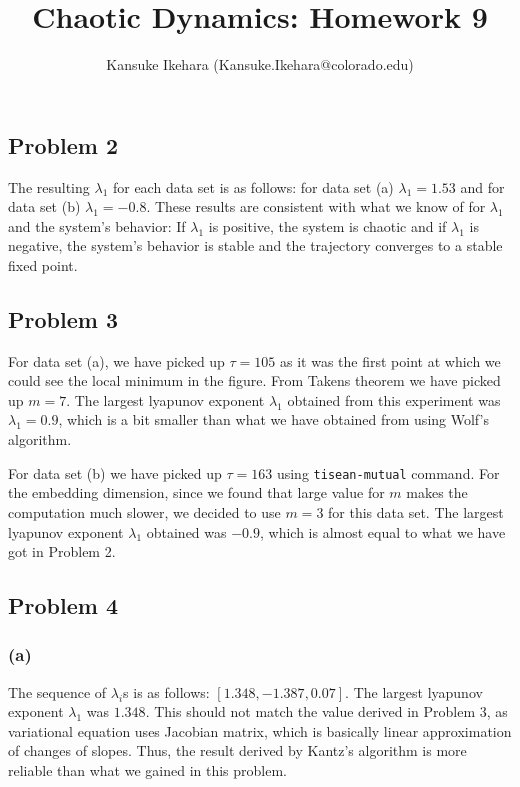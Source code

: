 \documentclass{article}
\title{Chaotic Dynamics: Homework 9}
\author{Kansuke Ikehara (Kansuke.Ikehara@colorado.edu)}
\begin{document}
\maketitle

\subsection*{Problem 2}
The resulting $\lambda_{1}$ for each data set is as follows: for data set (a) $\lambda_{1} = 1.53$ and for data set (b) $\lambda_{1} = -0.8$. These results are consistent with what we know of for $\lambda_{1}$ and the system's behavior: If $\lambda_{1}$ is positive, the system is chaotic and if $\lambda_{1}$ is negative, the system's behavior is stable and the trajectory converges to a stable fixed point.

\subsection*{Problem 3}
For data set (a), we have picked up $\tau = 105$ as it was the first point at which we could see the local minimum in the figure. From Takens theorem we have picked up $m = 7$. The largest lyapunov exponent $\lambda_{1}$ obtained from this experiment was $\lambda_{1} = 0.9$, which is a bit smaller than what we have obtained from using Wolf's algorithm.

For data set (b) we have picked up $\tau = 163$ using \texttt{tisean-mutual} command. For the embedding dimension, since we found that large value for $m$ makes the computation much slower, we decided to use $m = 3$ for this data set. The largest lyapunov exponent $\lambda_{1}$ obtained was $-0.9$, which is almost equal to what we have got in Problem 2.

\subsection*{Problem 4}
\subsubsection*{(a)}
The sequence of $\lambda_{i}$s is as follows: $[1.348, -1.387,  0.07]$.
The largest lyapunov exponent $\lambda_{1}$ was $1.348$. This should not match the value derived in Problem 3, as variational equation uses Jacobian matrix, which is basically linear approximation of changes of slopes. Thus, the result derived by Kantz's algorithm is more reliable than what we gained in this problem.
\end{document}
